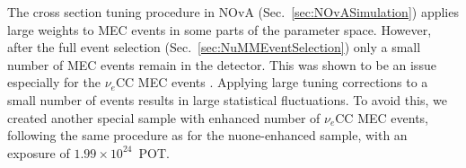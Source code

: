 
The cross section tuning procedure in \gls{NOvA} (Sec.~\ref{sec:NOvASimulation}) applies large weights to \gls{MEC} events in some parts of the parameter space. However, after the full event selection (Sec.~\ref{sec:NuMMEventSelection}) only a small number of \gls{MEC} events remain in the detector. This was shown to be an issue especially for the $\nu_e$\gls{CC} \gls{MEC} events  \cite{NOVA-doc-56383}. Applying large tuning corrections to a small number of events results in large statistical fluctuations. To avoid this, we created another special sample with enhanced number of $\nu_e$\gls{CC} \gls{MEC} events, following the same procedure as for the \gls{nuone}-enhanced sample, with an exposure of $1.99\times10^{24}$~\gls{POT}.



